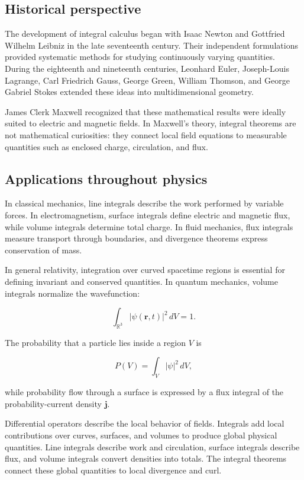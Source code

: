 \subsection{Historical perspective}

The development of integral calculus began with Isaac Newton and Gottfried
Wilhelm Leibniz in the late seventeenth century. Their independent formulations
provided systematic methods for studying continuously varying quantities.
During the eighteenth and nineteenth centuries, Leonhard Euler, Joseph-Louis
Lagrange, Carl Friedrich Gauss, George Green, William Thomson, and George
Gabriel Stokes extended these ideas into multidimensional geometry.

James Clerk Maxwell recognized that these mathematical results were ideally
suited to electric and magnetic fields. In Maxwell's theory, integral theorems
are not mathematical curiosities: they connect local field equations to
measurable quantities such as enclosed charge, circulation, and flux.

\subsection{Applications throughout physics}

In classical mechanics, line integrals describe the work performed by variable
forces. In electromagnetism, surface integrals define electric and magnetic
flux, while volume integrals determine total charge. In fluid mechanics, flux
integrals measure transport through boundaries, and divergence theorems express
conservation of mass.

In general relativity, integration over curved spacetime regions is essential
for defining invariant and conserved quantities. In quantum mechanics, volume
integrals normalize the wavefunction:

\begin{equation}
  \boxed{\int_{\mathbb R^3}\lvert\psi(\mathbf r,t)\rvert^2\,dV=1.}
\end{equation}

The probability that a particle lies inside a region $V$ is

\begin{equation}
  P(V)=\int_V \lvert\psi\rvert^2\,dV,
\end{equation}

while probability flow through a surface is expressed by a flux integral of
the probability-current density $\mathbf j$.

\begin{summarybox}
Differential operators describe the local behavior of fields. Integrals add
local contributions over curves, surfaces, and volumes to produce global
physical quantities. Line integrals describe work and circulation, surface
integrals describe flux, and volume integrals convert densities into totals.
The integral theorems connect these global quantities to local divergence and
curl.
\end{summarybox}

